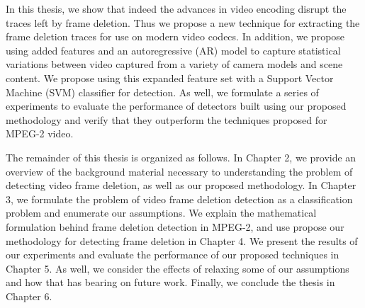 In this thesis, we show that indeed the advances in video encoding disrupt the traces left by frame deletion. Thus we propose a new technique for extracting the frame deletion traces for use on modern video codecs. In addition, we propose using added features and an autoregressive (AR) model to capture statistical variations between video captured from a variety of camera models and scene content. We propose using this expanded feature set with a Support Vector Machine (SVM) classifier for detection. As well, we formulate a series of experiments to evaluate the performance of detectors built using our proposed methodology and verify that they outperform the techniques proposed for MPEG-2 video.

The remainder of this thesis is organized as follows. In Chapter 2, we provide an overview of the background material necessary to understanding the problem of detecting video frame deletion, as well as our proposed methodology. In Chapter 3, we formulate the problem of video frame deletion detection as a classification problem and enumerate our assumptions. We explain the mathematical formulation behind frame deletion detection in MPEG-2, and use propose our methodology for detecting frame deletion in Chapter 4. We present the results of our experiments and evaluate the performance of our proposed techniques in Chapter 5. As well, we consider the effects of relaxing some of our assumptions and how that has bearing on future work. Finally, we conclude the thesis in Chapter 6.